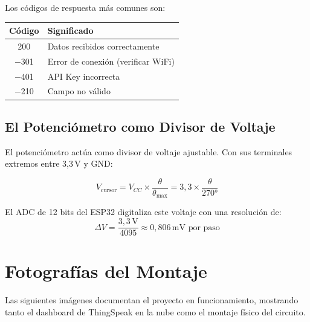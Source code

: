 \documentclass[12pt,a4paper]{article}
\begin{document}
Los códigos de respuesta más comunes son:

\begin{center}
\begin{tabular}{cl}
\toprule
\textbf{Código} & \textbf{Significado} \\
\midrule
200 & Datos recibidos correctamente \\
$-$301 & Error de conexión (verificar WiFi) \\
$-$401 & API Key incorrecta \\
$-$210 & Campo no válido \\
\bottomrule
\end{tabular}
\end{center}

\subsection{El Potenciómetro como Divisor de Voltaje}

El potenciómetro actúa como divisor de voltaje ajustable. Con sus terminales extremos entre 3,3\,V y GND:

\begin{equation}
V_{\text{cursor}} = V_{CC} \times \frac{\theta}{\theta_{\max}} = 3{,}3 \times \frac{\theta}{270°}
\label{eq:divisor}
\end{equation}

El ADC de 12 bits del ESP32 digitaliza este voltaje con una resolución de:
\begin{equation}
\Delta V = \frac{3{,}3\,\text{V}}{4095} \approx 0{,}806\,\text{mV por paso}
\end{equation}

\section{Fotografías del Montaje}

Las siguientes imágenes documentan el proyecto en funcionamiento, mostrando tanto el dashboard de ThingSpeak en la nube como el montaje físico del circuito.
\end{document}
